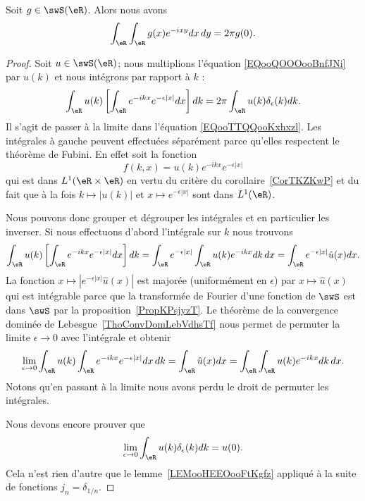 \begin{proposition}
    Soit \( g\in\swS(\eR)\). Alors nous avons
    \begin{equation}        \label{EQooBOJUooQGvMrk}
        \int_{\eR}\int_{\eR} g(x) e^{-ixy}dx\,dy=2\pi g(0).
    \end{equation}
\end{proposition}

\begin{proof}
    Soit \( u\in\swS(\eR)\); nous multiplions l'équation \eqref{EQooQOOOooBnfJNi} par \( u(k)\) et nous intégrons par rapport à \( k\) :
    \begin{equation}        \label{EQooTTQQooKxhxzl}
        \int_{\eR}u(k)\left[ \int_{\eR} e^{-ikx} e^{-\epsilon| x |}dx \right]dk=2\pi\int_{\eR}u(k)\delta_{\epsilon}(k)dk.
    \end{equation}
    Il s'agit de passer à la limite dans l'équation \eqref{EQooTTQQooKxhxzl}. Les intégrales à gauche peuvent effectuées séparément parce qu'elles respectent le théorème de Fubini. En effet soit la fonction
    \begin{equation}
        f(k,x)=u(k) e^{-ikx} e^{-\epsilon| x |}
    \end{equation}
    qui est dans \( L^1(\eR\times \eR)\) en vertu du critère du corollaire~\ref{CorTKZKwP} et du fait que à la fois \( k\mapsto | u(k) | \) et \( x\mapsto  e^{-\epsilon| x |}\) sont dans \( L^1(\eR)\).

    Nous pouvons donc grouper et dégrouper les intégrales et en particulier les inverser. Si nous effectuons d'abord l'intégrale sur \( k\) nous trouvons
    \begin{equation}
        \int_{\eR}u(k)\left[ \int_{\eR} e^{-ikx} e^{-\epsilon| x |}dx \right]dk=\int_{\eR} e^{-\epsilon| x |}\int_{\eR}u(k) e^{-ikx}dk\,dx=\int_{\eR} e^{-\epsilon| x |}\hat u(x)dx.
    \end{equation}
    La fonction \( x\mapsto |  e^{-\epsilon| x |}\hat u(x) |\) est majorée (uniformément en \( \epsilon\)) par \( x\mapsto \hat u(x)\) qui est intégrable parce que la transformée de Fourier d'une fonction de \( \swS\) est dans \( \swS\) par la proposition~\ref{PropKPsjyzT}. Le théorème de la convergence dominée de Lebesgue~\ref{ThoConvDomLebVdhsTf} nous permet de permuter la limite \( \epsilon\to 0 \) avec l'intégrale et obtenir
    \begin{equation}
        \lim_{\epsilon\to 0}\int_{\eR}u(k)\int_{\eR} e^{-ikx} e^{-\epsilon| x |}dx\,dk=\int_{\eR}\hat u(x)dx=\int_{\eR}\int_{\eR}u(k) e^{-ikx}dk\,dx.
    \end{equation}
    Notons qu'en passant à la limite nous avons perdu le droit de permuter les intégrales.

    Nous devons encore prouver que
    \begin{equation}
        \lim_{\epsilon\to 0}\int_{\eR}u(k)\delta_{\epsilon}(k)dk=u(0).
    \end{equation}
    Cela n'est rien d'autre que le lemme~\ref{LEMooHEEOooFtKgfz} appliqué à la suite de fonctions \( j_n=\delta_{1/n}\).
\end{proof}

